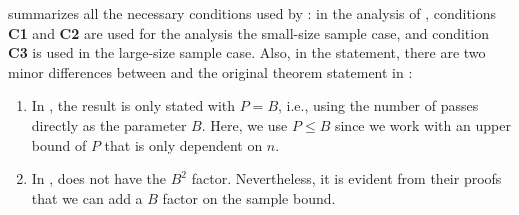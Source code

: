  summarizes all the necessary conditions used by \cite{AW23BestArm}: in the analysis of \cite{AW23BestArm}, conditions \textbf{C1} and \textbf{C2} are used for the analysis the small-size sample case, and condition \textbf{C3} is used in the large-size sample case. Also, in the statement, there are two minor differences between  and the original theorem statement in \cite{AW23BestArm}:
\begin{enumerate}
	\item In \cite{AW23BestArm}, the result is only stated with $P=B$, i.e., using the number of passes directly as the parameter $B$. Here, we use $P\leq B$ since we work with an upper bound of $P$ that is only dependent on $n$.
	\item In \cite{AW23BestArm},  does not have the $B^2$ factor. Nevertheless, it is evident from their proofs that we can add a $B$ factor on the sample bound.
\end{enumerate}


